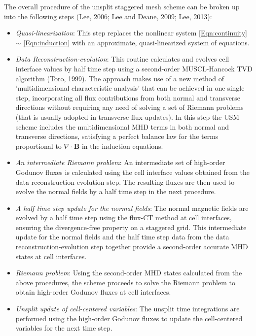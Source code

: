 The overall procedure of the
unsplit staggered mesh scheme can be broken up into the following steps 
(Lee, 2006; Lee and Deane, 2009; Lee, 2013):
\begin{itemize}
\item {\itshape Quasi-linearization}: This step replaces the nonlinear system
\eqref{Eqn:continuity} $\sim$ \eqref{Eqn:induction}
with an approximate, quasi-linearized system of equations.

\item {\itshape Data Reconstruction-evolution}:
This routine calculates and evolves cell interface values by half time step 
using a second-order MUSCL-Hancock TVD algorithm (Toro, 1999).
The approach makes use of a new method of 'multidimensional characteristic analysis'
that can be achieved in one single step, incorporating all flux contributions from both normal and transverse directions
without requiring any need of solving a set of Riemann problems (that is usually adopted in transverse flux updates). 
In this step the USM scheme includes the multidimensional MHD terms in both normal and transverse directions,
satisfying a perfect balance law for the terms proportional to $\nabla \cdot \mathbf{B}$ in the induction equations.

\item {\itshape An intermediate Riemann problem}:
An intermediate set of high-order Godunov fluxes is calculated using the cell interface values obtained
from the data reconstruction-evolution step. The resulting fluxes are then used to evolve the normal
fields by a half time step in the next procedure.

\item {\itshape A half time step update for the normal fields}:
The normal magnetic fields are evolved by a half time step using the flux-CT method at cell interfaces,
ensuring the divergence-free property on a staggered grid.
This intermediate update for the normal fields and the half time step data from the data reconstruction-evolution
step together provide a second-order accurate MHD states at cell interfaces.

\item {\itshape Riemann problem}:
Using the second-order MHD states calculated from the above procedures, 
the scheme proceeds to solve the Riemann problem to obtain high-order Godunov fluxes at cell interfaces.

\item {\itshape Unsplit update of cell-centered variables}: 
The unsplit time integrations are performed using the high-order Godunov fluxes to update 
the cell-centered variables for the next time step.


\end{itemize}
